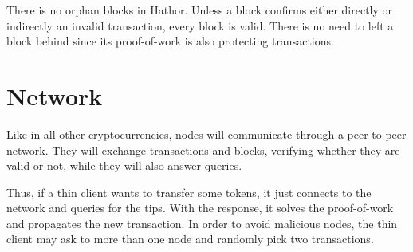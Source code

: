 There is no orphan blocks in Hathor. Unless a block confirms either directly or indirectly an invalid transaction, every block is valid. There is no need to left a block behind since its proof-of-work is also protecting transactions.


\section{Network}

Like in all other cryptocurrencies, nodes will communicate through a peer-to-peer network. They will exchange transactions and blocks, verifying whether they are valid or not, while they will also answer queries.

Thus, if a thin client wants to transfer some tokens, it just connects to the network and queries for the tips. With the response, it solves the proof-of-work and propagates the new transaction. In order to avoid malicious nodes, the thin client may ask to more than one node and randomly pick two transactions.
